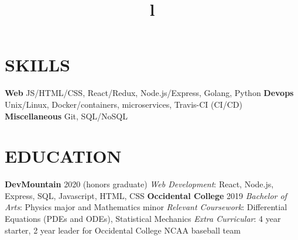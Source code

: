 \documentclass[margin]{res}
\begin{document}
\begin{resume}

\section{SKILLS}

\textbf{Web} JS/HTML/CSS, React/Redux, Node.js/Express, Golang, Python\newline
\textbf{Devops} Unix/Linux, Docker/containers, microservices, Travis-CI (CI/CD)\newline
\textbf{Miscellaneous} Git, SQL/NoSQL

\section{EDUCATION}
\textbf{DevMountain} 2020 (honors graduate)\newline
{\sl Web Development}: React, Node.js, Express, SQL, Javascript, HTML, CSS\newline
\textbf{Occidental College} 2019\newline
{\sl Bachelor of Arts}: Physics major and Mathematics minor\newline
{\sl Relevant Coursework}: Differential Equations (PDEs and ODEs), Statistical Mechanics\newline
{\sl Extra Curricular}: 4 year starter, 2 year leader for Occidental College NCAA baseball team


\begin{format}
\title{l}\\
\\
\body\\
\end{format}


\end{resume}
\end{document}

